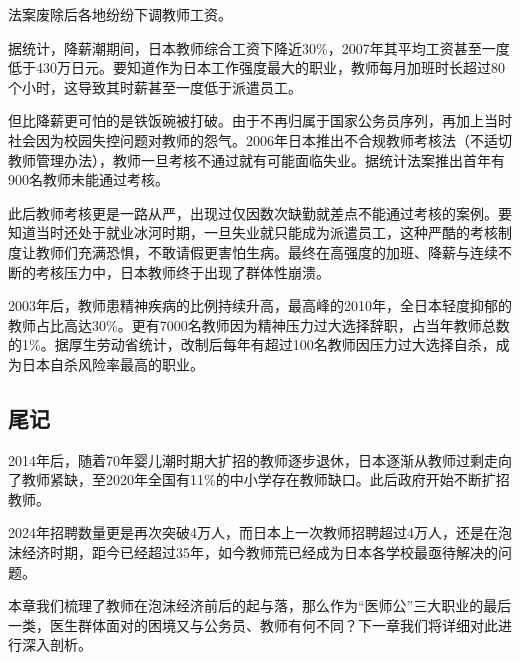 法案废除后各地纷纷下调教师工资。

据统计，降薪潮期间，日本教师综合工资下降近30\%，2007年其平均工资甚至一度低于430万日元。要知道作为日本工作强度最大的职业，教师每月加班时长超过80个小时，这导致其时薪甚至一度低于派遣员工。

但比降薪更可怕的是铁饭碗被打破。由于不再归属于国家公务员序列，再加上当时社会因为校园失控问题对教师的怨气。2006年日本推出不合规教师考核法（不适切教师管理办法），教师一旦考核不通过就有可能面临失业。据统计法案推出首年有900名教师未能通过考核。

此后教师考核更是一路从严，出现过仅因数次缺勤就差点不能通过考核的案例。要知道当时还处于就业冰河时期，一旦失业就只能成为派遣员工，这种严酷的考核制度让教师们充满恐惧，不敢请假更害怕生病。最终在高强度的加班、降薪与连续不断的考核压力中，日本教师终于出现了群体性崩溃。

2003年后，教师患精神疾病的比例持续升高，最高峰的2010年，全日本轻度抑郁的教师占比高达30\%。更有7000名教师因为精神压力过大选择辞职，占当年教师总数的1\%。据厚生劳动省统计，改制后每年有超过100名教师因压力过大选择自杀，成为日本自杀风险率最高的职业。

\subsection{尾记}

2014年后，随着70年婴儿潮时期大扩招的教师逐步退休，日本逐渐从教师过剩走向了教师紧缺，至2020年全国有11\%的中小学存在教师缺口。此后政府开始不断扩招教师。

2024年招聘数量更是再次突破4万人，而日本上一次教师招聘超过4万人，还是在泡沫经济时期，距今已经超过35年，如今教师荒已经成为日本各学校最亟待解决的问题。

本章我们梳理了教师在泡沫经济前后的起与落，那么作为“医师公”三大职业的最后一类，医生群体面对的困境又与公务员、教师有何不同？下一章我们将详细对此进行深入剖析。
